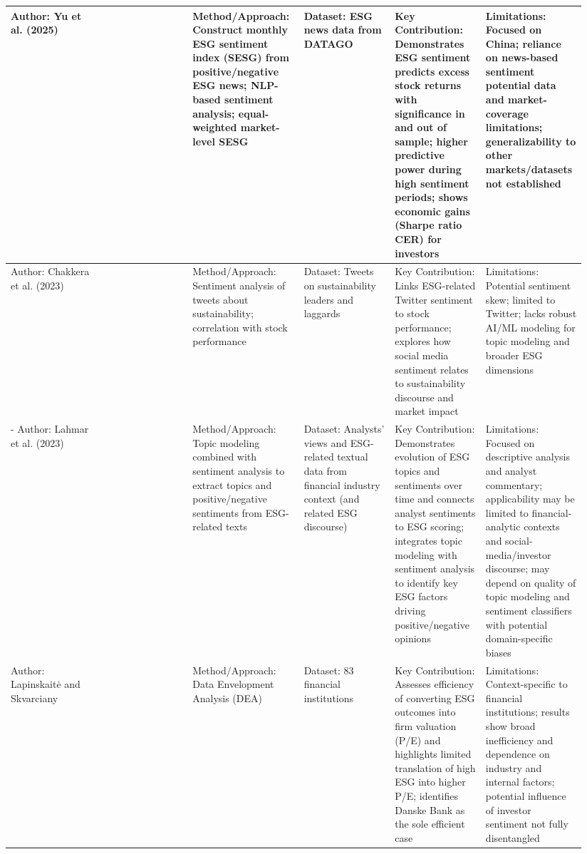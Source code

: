 \documentclass{article}
\begin{document}
\begin{landscape}
\begin{longtable}{p{0.157\linewidth} p{0.157\linewidth} p{0.157\linewidth} p{0.157\linewidth} p{0.157\linewidth} p{0.157\linewidth}}
Author: Yu et al. (2025) & ~ & Method/Approach: Construct monthly ESG sentiment index (SESG) from positive/negative ESG news; NLP-based sentiment analysis; equal-weighted market-level SESG & Dataset: ESG news data from DATAGO & Key Contribution: Demonstrates ESG sentiment predicts excess stock returns with significance in and out of sample; higher predictive power during high sentiment periods; shows economic gains (Sharpe ratio CER) for investors & Limitations: Focused on China; reliance on news-based sentiment potential data and market-coverage limitations; generalizability to other markets/datasets not established \\ \hline
Author: Chakkera et al. (2023) & ~ & Method/Approach: Sentiment analysis of tweets about sustainability; correlation with stock performance & Dataset: Tweets on sustainability leaders and laggards & Key Contribution: Links ESG-related Twitter sentiment to stock performance; explores how social media sentiment relates to sustainability discourse and market impact & Limitations: Potential sentiment skew; limited to Twitter; lacks robust AI/ML modeling for topic modeling and broader ESG dimensions \\ \hline
- Author: Lahmar et al. (2023) & ~ & Method/Approach: Topic modeling combined with sentiment analysis to extract topics and positive/negative sentiments from ESG-related texts & Dataset: Analysts’ views and ESG-related textual data from financial industry context (and related ESG discourse) & Key Contribution: Demonstrates evolution of ESG topics and sentiments over time and connects analyst sentiments to ESG scoring; integrates topic modeling with sentiment analysis to identify key ESG factors driving positive/negative opinions & Limitations: Focused on descriptive analysis and analyst commentary; applicability may be limited to financial-analytic contexts and social-media/investor discourse; may depend on quality of topic modeling and sentiment classifiers with potential domain-specific biases \\ \hline
Author: Lapinskaitė and Skvarciany & ~ & Method/Approach: Data Envelopment Analysis (DEA) & Dataset: 83 financial institutions & Key Contribution: Assesses efficiency of converting ESG outcomes into firm valuation (P/E) and highlights limited translation of high ESG into higher P/E; identifies Danske Bank as the sole efficient case & Limitations: Context-specific to financial institutions; results show broad inefficiency and dependence on industry and internal factors; potential influence of investor sentiment not fully disentangled \\ \hline

\end{longtable}
\end{landscape}
\end{document}

